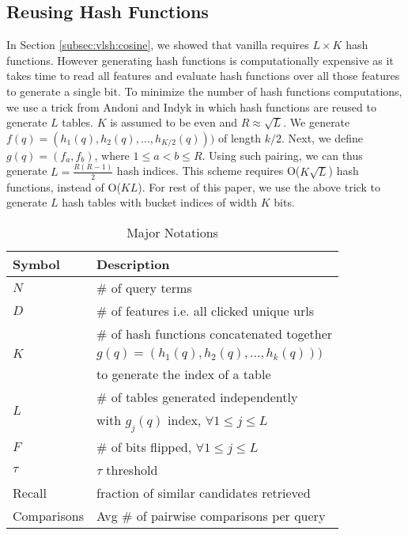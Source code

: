 \subsection{Reusing Hash Functions}
\label{subsec:resuseHash}
In Section \ref{subsec:vlsh:cosine}, we showed that vanilla \lsh requires $L\times K$ hash functions. 
However generating hash functions is computationally expensive as 
it takes time to read all features and 
evaluate hash functions over all those features to generate a single bit. 
To minimize the number of hash functions computations, 
we use a trick from Andoni and Indyk  
in which hash functions are reused to generate $L$ tables. $K$ is assumed to be even and $R \approx	\sqrt L$. 
We generate $f(q)=(h_1(q),h_2(q),\dots,h_{K/2}(q)))$ of length $k/2$. 
Next, we define $g(q)=(f_a,f_b)$, where $1\leq a < b \leq R$. Using such pairing, we
can thus generate $L= \frac{R (R -1)}{2}$ hash indices. 
This scheme requires O($K  \sqrt L$) hash functions, instead of O($KL$).    
For rest of this paper, we use the above trick to generate $L$ hash tables with bucket indices of width $K$ bits.  
\begin{table}
\centering
{
\small \addtolength{\tabcolsep}{-4.5pt}
\begin{tabular}{ll}
\hline
\hline
 \textbf{Symbol} &  \textbf{Description} \\
\hline 
$N$ & \# of query terms \\
$D$ & \# of features i.e. all clicked unique urls \\
\hline
\multirow{3}{*}{$K$} & \# of hash functions concatenated together \\ 
   & $g(q)=(h_1(q),h_2(q),\dots,h_k(q)))$ \\ 
	 & to generate the index of a table \\
\hline
 \multirow{2}{*}{$L$} & \# of tables generated independently \\ 
	  &  with $g_j(q)$ index, $\forall 1 \leq j \leq  L$  \\
\hline
$F$ & \# of bits flipped, $\forall 1 \leq j \leq  L$   \\
$\tau$ & $\tau$ threshold \\
Recall & fraction of similar candidates retrieved \\
Comparisons & Avg \# of pairwise comparisons per query  \\
\hline 
\end{tabular}
\caption{\footnotesize{Major Notations}}
}
\label{tab:notation}
\end{table}


